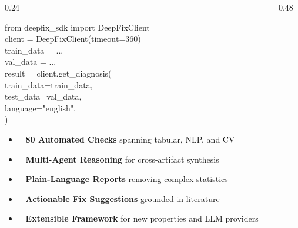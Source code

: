 \documentclass[final,t]{beamer}
\newcommand{\iconbullet}[2]{%
  \raisebox{-1pt}{\textcolor{TUMAccent}{\large #1}}~#2%
}
\begin{document}
\begin{frame}[fragile]
\begin{columns}[T]
\begin{column}{0.24\textwidth}
\begin{posterblock}
  \vspace{6mm}
  \begin{tcolorbox}[
    enhanced, colback=TUMDarkBlue!5, colframe=TUMDarkBlue!40,
    boxrule=1.5pt, arc=4pt, left=8mm, right=8mm, top=6mm, bottom=6mm,
  ]
    {\fontsize{24}{30}\selectfont\ttfamily\color{TUMDarkBlue}
    from deepfix\_sdk import DeepFixClient \\
    client = DeepFixClient(timeout=360) \\
    train\_data = ... \\
    val\_data = ... \\
    result = client.get\_diagnosis( \\
       train\_data=train\_data, \\
       test\_data=val\_data, \\
       language="english",\\
    )
    }
  \end{tcolorbox}

\end{posterblock}

\vspace{12mm}

\begin{posterblock}
  \fontsize{22}{28}\selectfont\color{BodyText}
  \begin{itemize}[leftmargin=8mm, itemsep=4mm, label={}]
    \item \iconbullet{\textbf{$\boldsymbol{\mathcal{Q}}$}}{%
      \textbf{80 Automated Checks} spanning tabular, NLP, and CV}
    \item \iconbullet{\textbf{$\boldsymbol{\mathcal{A}}$}}{%
      \textbf{Multi-Agent Reasoning} for cross-artifact synthesis}
    \item \iconbullet{\textbf{$\boldsymbol{\mathcal{R}}$}}{%
      \textbf{Plain-Language Reports} removing complex statistics}
    \item \iconbullet{\textbf{$\boldsymbol{\mathcal{F}}$}}{%
      \textbf{Actionable Fix Suggestions} grounded in literature}
    \item \iconbullet{\textbf{$\boldsymbol{\mathcal{E}}$}}{%
      \textbf{Extensible Framework} for new properties and LLM providers}
  \end{itemize}
\end{posterblock}

\end{column}

\hfill

\begin{column}{0.48\textwidth}


\end{column}
\end{columns}
\end{frame}
\end{document}

